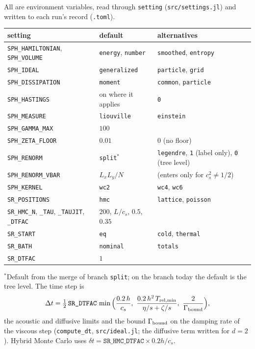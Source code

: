 \documentclass[11pt,aps,preprint,nofootinbib,superscriptaddress,tightenlines]{revtex4-2}
\def\st{\begin{equation}}
\def\stp{\end{equation}}
\begin{document}
All are environment variables, read through \texttt{setting} (\texttt{src/settings.jl}) and written to each run's record (\texttt{.toml}).
\begin{center}\small
\begin{tabular}{lll}
\toprule
setting & default & alternatives \\ \midrule
\texttt{SPH\_HAMILTONIAN}, \texttt{SPH\_VOLUME} & \texttt{energy}, \texttt{number} & \texttt{smoothed}, \texttt{entropy} \\
\texttt{SPH\_IDEAL} & \texttt{generalized} & \texttt{particle}, \texttt{grid} \\
\texttt{SPH\_DISSIPATION} & \texttt{moment} & \texttt{common}, \texttt{particle} \\
\texttt{SPH\_HASTINGS} & on where it applies & \texttt{0} \\
\texttt{SPH\_MEASURE} & \texttt{liouville} & \texttt{einstein} \\
\texttt{SPH\_GAMMA\_MAX} & $100$ & \\
\texttt{SPH\_ZETA\_FLOOR} & $0.01$ & $0$ (no floor) \\
\texttt{SPH\_RENORM} & \texttt{split}$^\ast$ & \texttt{legendre}, \texttt{1} (label only), \texttt{0} (tree level) \\
\texttt{SPH\_RENORM\_VBAR} & $L_xL_y/N$ & (enters only for $c_s^2\neq1/2$) \\
\texttt{SPH\_KERNEL} & \texttt{wc2} & \texttt{wc4}, \texttt{wc6} \\
\texttt{SR\_POSITIONS} & \texttt{hmc} & \texttt{lattice}, \texttt{poisson} \\
\texttt{SR\_HMC\_N}, \texttt{\_TAU}, \texttt{\_TAUJIT}, \texttt{\_DTFAC} & $200$, $L/c_s$, $0.5$, $0.35$ & \\
\texttt{SR\_START} & \texttt{eq} & \texttt{cold}, \texttt{thermal} \\
\texttt{SR\_BATH} & \texttt{nominal} & \texttt{totals} \\
\texttt{SR\_DTFAC} & $1$ & \\
\bottomrule
\end{tabular}
\end{center}
$^\ast$Default from the merge of branch \texttt{split}; on the branch today the default is the tree level.  The time step is
\st
\Delta t=\tfrac12\,\texttt{SR\_DTFAC}\,\min\Big(\frac{0.2\,h}{c_s},\ \frac{0.2\,h^2\,T_{\rm rel,min}}{\eta/s+\zeta/s},\ \frac{2}{\Gamma_{\rm bound}}\Big),
\stp
the acoustic and diffusive limits and the bound $\Gamma_{\rm bound}$ on the damping rate of the viscous step (\texttt{compute\_dt},
\texttt{src/ideal.jl}; the diffusive term written for $d=2$).  Hybrid Monte Carlo uses $\delta t=\texttt{SR\_HMC\_DTFAC}\times0.2h/c_s$.
\end{document}
